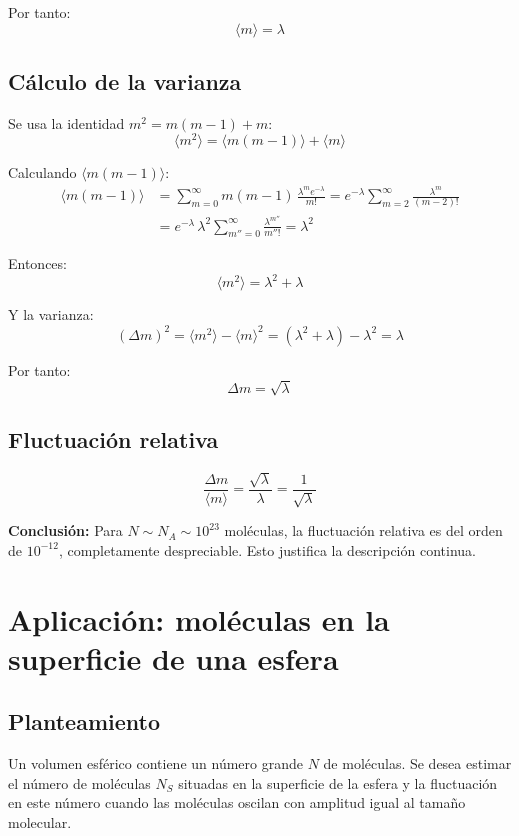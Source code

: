 Por tanto:
$$
\boxed{\langle m \rangle = \lambda}
$$

\subsection{Cálculo de la varianza}

Se usa la identidad $m^2 = m(m-1) + m$:
$$
\langle m^2 \rangle = \langle m(m-1) \rangle + \langle m \rangle
$$

Calculando $\langle m(m-1) \rangle$:
\begin{align*}
\langle m(m-1) \rangle &= \sum_{m=0}^{\infty} m(m-1)\, \frac{\lambda^m e^{-\lambda}}{m!} = e^{-\lambda} \sum_{m=2}^{\infty} \frac{\lambda^m}{(m-2)!} \\
&= e^{-\lambda}\, \lambda^2 \sum_{m''=0}^{\infty} \frac{\lambda^{m''}}{m''!} = \lambda^2
\end{align*}

Entonces:
$$
\langle m^2 \rangle = \lambda^2 + \lambda
$$

Y la varianza:
$$
(\Delta m)^2 = \langle m^2 \rangle - \langle m \rangle^2 = (\lambda^2 + \lambda) - \lambda^2 = \lambda
$$

Por tanto:
$$
\boxed{\Delta m = \sqrt{\lambda}}
$$

\subsection{Fluctuación relativa}

$$
\frac{\Delta m}{\langle m \rangle} = \frac{\sqrt{\lambda}}{\lambda} = \frac{1}{\sqrt{\lambda}}
$$

\textbf{Conclusión:} Para $N \sim N_A \sim 10^{23}$ moléculas, la fluctuación relativa es del orden de $10^{-12}$, completamente despreciable. Esto justifica la descripción continua.

\section{Aplicación: moléculas en la superficie de una esfera}

\subsection{Planteamiento}

Un volumen esférico contiene un número grande $N$ de moléculas. Se desea estimar el número de moléculas $N_S$ situadas en la superficie de la esfera y la fluctuación en este número cuando las moléculas oscilan con amplitud igual al tamaño molecular.

